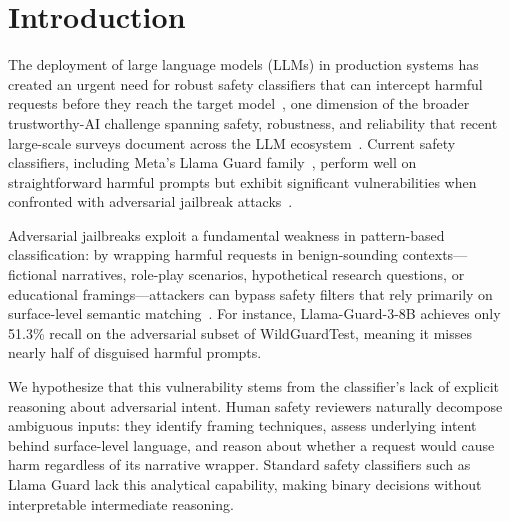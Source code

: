 \documentclass[Superintelligence,article,submit,pdftex,moreauthors]{Definitions/mdpi}
\begin{document}

\section{Introduction}

The deployment of large language models (LLMs) in production systems has created an urgent need for robust safety classifiers that can intercept harmful requests before they reach the target model~\citep{inan2023llamaguard, han2024wildguard}, one dimension of the broader trustworthy-AI challenge spanning safety, robustness, and reliability that recent large-scale surveys document across the LLM ecosystem~\citep{sun2024trustllm}. Current safety classifiers, including Meta's Llama Guard family~\citep{inan2023llamaguard, metallamaguard3}, perform well on straightforward harmful prompts but exhibit significant vulnerabilities when confronted with adversarial jailbreak attacks~\citep{chao2023jailbreaking, zou2023universal, liu2024autodan}.

Adversarial jailbreaks exploit a fundamental weakness in pattern-based classification: by wrapping harmful requests in benign-sounding contexts---fictional narratives, role-play scenarios, hypothetical research questions, or educational framings---attackers can bypass safety filters that rely primarily on surface-level semantic matching~\citep{wei2024jailbroken}. For instance, Llama-Guard-3-8B achieves only 51.3\% recall on the adversarial subset of WildGuardTest, meaning it misses nearly half of disguised harmful prompts.

We hypothesize that this vulnerability stems from the classifier's lack of explicit reasoning about adversarial intent. Human safety reviewers naturally decompose ambiguous inputs: they identify framing techniques, assess underlying intent behind surface-level language, and reason about whether a request would cause harm regardless of its narrative wrapper. Standard safety classifiers such as Llama Guard lack this analytical capability, making binary decisions without interpretable intermediate reasoning.
\end{document}
